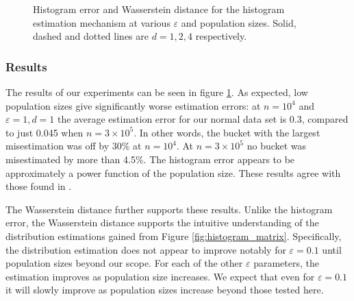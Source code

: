 \documentclass[a4paper,12pt]{article}
\renewcommand{\epsilon}{\varepsilon}
\begin{document}
\begin{figure}
{    }
    \caption{Histogram error and Wasserstein distance for the histogram estimation mechanism at various $\epsilon$ and population sizes. Solid, dashed and dotted lines are $d=1,2,4$ respectively.}
    \label{fig:histogram_errors}
\end{figure}

\subsubsection{Results}

The results of our experiments can be seen in figure \ref{fig:histogram_errors}. As expected, low population sizes give significantly worse estimation errors: at $n=10^4$ and $\epsilon=1,d=1$ the average estimation error for our normal data set is 0.3, compared to just 0.045 when $n=3\times10^5$. In other words, the bucket with the largest misestimation was off by 30\% at $n=10^4$. At $n=3\times 10^5$ no bucket was misestimated by more than 4.5\%. The histogram error appears to be approximately a power function of the population size. These results agree with those found in \cite{microsoft_telemetry}.

The Wasserstein distance further supports these results. Unlike the histogram error, the Wasserstein distance supports the intuitive understanding of the distribution estimations gained from Figure \ref{fig:histogram_matrix}. Specifically, the distribution estimation does not appear to improve notably for $\epsilon=0.1$ until population sizes beyond our scope. For each of the other $\epsilon$ parameters, the estimation improves as population size increases. We expect that even for $\epsilon=0.1$ it will slowly improve as population sizes increase beyond those tested here. 
\end{document}

